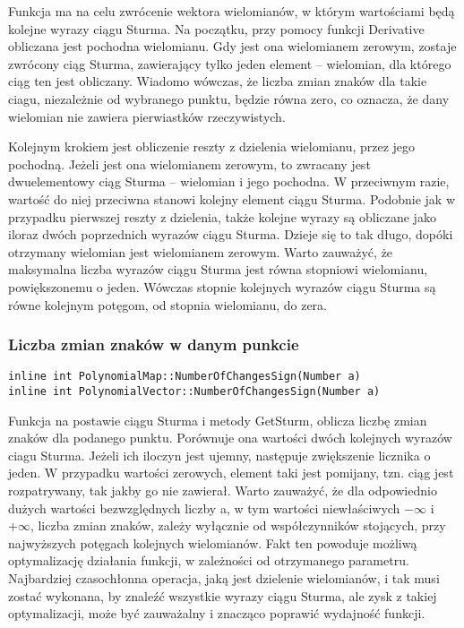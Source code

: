 \documentclass[twoside,a4paper]{book}
\begin{document}
Funkcja ma na celu zwrócenie wektora wielomianów, w którym wartościami będą kolejne wyrazy ciągu Sturma. Na początku, przy pomocy funkcji Derivative obliczana jest pochodna wielomianu. Gdy jest ona wielomianem zerowym, zostaje zwrócony ciąg Sturma, zawierający tylko jeden element – wielomian, dla którego ciąg ten jest obliczany. Wiadomo wówczas, że liczba zmian znaków dla takie ciagu, niezależnie od wybranego punktu, będzie równa zero, co oznacza, że dany wielomian nie zawiera pierwiastków rzeczywistych.

Kolejnym krokiem jest obliczenie reszty z dzielenia wielomianu, przez jego pochodną. Jeżeli jest ona wielomianem zerowym, to zwracany jest dwuelementowy ciąg Sturma – wielomian i jego pochodna. W przeciwnym razie, wartość do niej przeciwna stanowi kolejny element ciągu Sturma. Podobnie jak w przypadku pierwszej reszty z dzielenia, także kolejne wyrazy są obliczane jako iloraz dwóch poprzednich wyrazów ciągu Sturma. Dzieje się to tak długo, dopóki otrzymany wielomian jest wielomianem zerowym. Warto zauważyć, że maksymalna liczba wyrazów ciągu Sturma jest równa stopniowi wielomianu, powiększonemu o jeden. Wówczas stopnie kolejnych wyrazów ciągu Sturma są równe kolejnym potęgom, od stopnia wielomianu, do zera.
\\

\subsubsection{Liczba zmian znaków w danym punkcie}
\begin{lstlisting}
inline int PolynomialMap::NumberOfChangesSign(Number a)
inline int PolynomialVector::NumberOfChangesSign(Number a)
\end{lstlisting}

Funkcja na postawie ciągu Sturma i metody GetSturm, oblicza liczbę zmian znaków dla podanego punktu. Porównuje ona wartości dwóch kolejnych wyrazów ciagu Sturma. Jeżeli ich iloczyn jest ujemny, następuje zwiększenie licznika o jeden. W przypadku wartości zerowych, element taki jest pomijany, tzn. ciąg jest rozpatrywany, tak jakby go nie zawierał. Warto zauważyć, że dla odpowiednio dużych wartości bezwzględnych liczby a, w tym wartości niewłaściwych $-\infty$ i $+\infty$, liczba zmian znaków, zależy wyłącznie od współczynników stojących, przy najwyższych potęgach kolejnych wielomianów. Fakt ten powoduje możliwą optymalizację działania funkcji, w zależności od otrzymanego parametru. Najbardziej czasochłonna operacja, jaką jest dzielenie wielomianów, i tak musi zostać wykonana, by znaleźć wszystkie wyrazy ciągu Sturma, ale zysk z takiej optymalizacji, może być zauważalny i znacząco poprawić wydajność funkcji.
\end{document}
